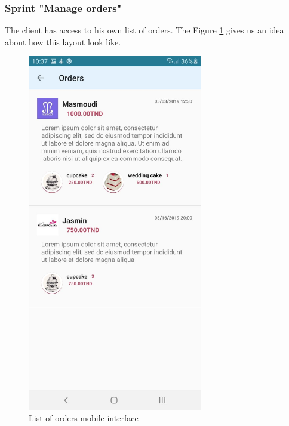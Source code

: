 \documentclass[12pt,a4paper]{report}
\begin{document}
\subsubsection*{Sprint "Manage orders"}
The client has access to his own list of orders. The Figure \ref{orderlistmobile-interface} gives us an idea about how this layout look like.
\begin{figure}[H]
	\vspace*{1in}
	\centering
	\includegraphics[width=3in,keepaspectratio]{orderlistmobile.jpg}
	\caption{List of orders mobile interface}
	\label{orderlistmobile-interface}
\end{figure}
\clearpage
\end{document}
